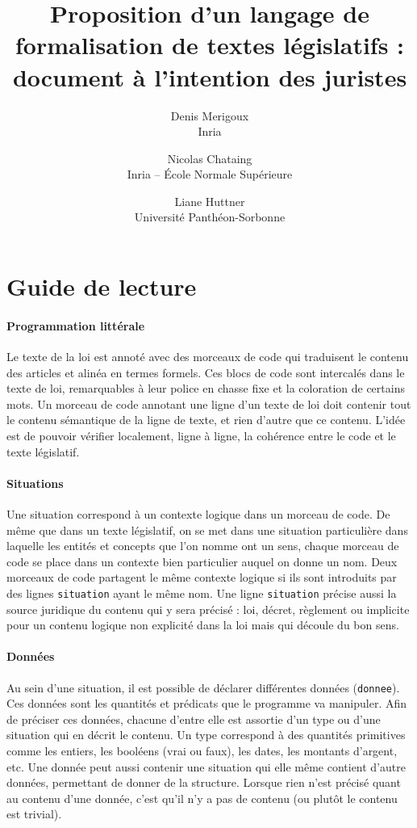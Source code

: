 \documentclass[11pt, french]{article}
\title{
  Proposition d'un langage de formalisation de textes législatifs :\\
  document à l'intention des juristes
}
\author{
  Denis Merigoux\\Inria\and
  Nicolas Chataing\\Inria -- École Normale Supérieure\and
  Liane Huttner\\Université Panthéon-Sorbonne
}
\begin{document}
\maketitle

\section{Guide de lecture}

\paragraph{Programmation littérale} Le texte de la loi est annoté avec des morceaux de code qui traduisent le contenu des articles et alinéa en termes formels. Ces blocs de code sont intercalés dans le texte de loi, remarquables à leur police en chasse fixe et la coloration de certains mots. Un morceau de code annotant une ligne d'un texte de loi doit contenir tout le contenu sémantique de la ligne de texte, et rien d'autre que ce contenu. L'idée est de pouvoir vérifier localement, ligne à ligne, la cohérence entre le code et le texte législatif.

\paragraph{Situations} Une situation correspond à un contexte logique dans un morceau de code. De même que dans un texte législatif, on se met dans une situation particulière dans laquelle les entités et concepts que l'on nomme ont un sens, chaque morceau de code se place dans un contexte bien particulier auquel on donne un nom. Deux morceaux de code partagent le même contexte logique si ils sont introduits par des lignes \lstinline|situation| ayant le même nom. Une ligne \lstinline|situation| précise aussi la source juridique du contenu qui y sera précisé : loi, décret, règlement ou implicite pour un contenu logique non explicité dans la loi mais qui découle du bon sens.

\paragraph{Données} Au sein d'une situation, il est possible de déclarer différentes données (\lstinline|donnee|). Ces données sont les quantités et prédicats que le programme va manipuler. Afin de préciser ces données, chacune d'entre elle est assortie d'un type ou d'une situation qui en décrit le contenu. Un type correspond à des quantités primitives comme les entiers, les booléens (vrai ou faux), les dates, les montants d'argent, etc. Une donnée peut aussi contenir une situation qui elle même contient d'autre données, permettant de donner de la structure. Lorsque rien n'est précisé quant au contenu d'une donnée, c'est qu'il n'y a pas de contenu (ou plutôt le contenu est trivial).
\end{document}
